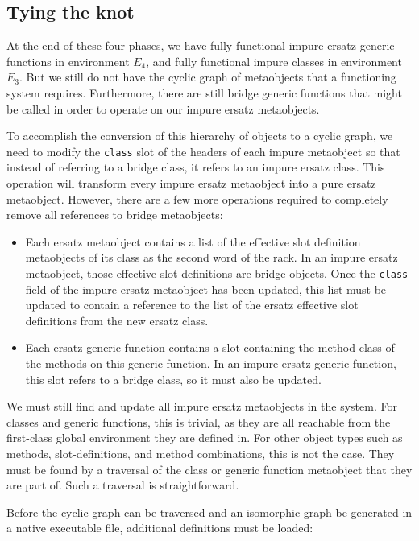 \subsection{Tying the knot}

At the end of these four phases, we have fully functional impure ersatz
generic functions in environment $E_4$, and fully functional impure
classes in environment $E_3$.  But we still do not have the cyclic graph
of metaobjects that a functioning \clos{} system requires.
Furthermore, there are still bridge generic functions
that might be called in order to operate on our impure ersatz
metaobjects.

To accomplish the conversion of this hierarchy of objects to a cyclic
graph, we need to modify the \texttt{class} slot of the headers of
each impure metaobject so that instead of referring to a bridge class,
it refers to an impure ersatz class.  This operation will transform
every impure ersatz metaobject into a pure ersatz metaobject.
However, there are a few more operations required to completely remove
all references to bridge metaobjects:

\begin{itemize}
\item Each ersatz metaobject contains a list of the effective slot
  definition metaobjects of its class as the second word of the rack.
  In an impure ersatz metaobject, those effective slot definitions are
  bridge objects.  Once the \texttt{class} field of the impure ersatz
  metaobject has been updated, this list must be updated to contain a
  reference to the list of the ersatz effective slot definitions from
  the new ersatz class.
\item Each ersatz generic function contains a slot containing the
  method class of the methods on this generic function.  In an impure
  ersatz generic function, this slot refers to a bridge class, so it
  must also be updated.
\end{itemize}

We must still find and update all impure ersatz metaobjects in the
system.  For classes and generic functions, this is trivial, as they
are all reachable from the first-class global environment they are
defined in.  For other object types such as methods, slot-definitions,
and method combinations, this is not the case.  They must be found by
a traversal of the class or generic function metaobject that they are
part of.  Such a traversal is straightforward.

Before the cyclic graph can be traversed and an isomorphic graph be
generated in a native executable file, additional definitions must be
loaded:

